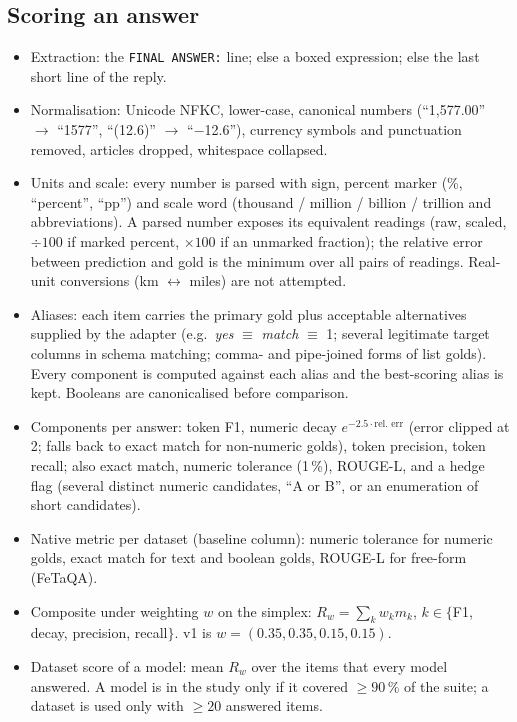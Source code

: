 \documentclass[11pt]{article}
\begin{document}
\subsection{Scoring an answer}
\begin{itemize}
\item Extraction: the \texttt{FINAL ANSWER:} line; else a boxed expression; else the last short line of the reply.
\item Normalisation: Unicode NFKC, lower-case, canonical numbers (``1,577.00'' $\to$ ``1577'', ``(12.6)'' $\to$ ``$-$12.6''), currency symbols and punctuation removed, articles dropped, whitespace collapsed.
\item Units and scale: every number is parsed with sign, percent marker (\%, ``percent'', ``pp'') and scale word (thousand / million / billion / trillion and abbreviations). A parsed number exposes its equivalent readings (raw, scaled, $\div 100$ if marked percent, $\times 100$ if an unmarked fraction); the relative error between prediction and gold is the minimum over all pairs of readings. Real-unit conversions (km $\leftrightarrow$ miles) are not attempted.
\item Aliases: each item carries the primary gold plus acceptable alternatives supplied by the adapter (e.g.\ \emph{yes} $\equiv$ \emph{match} $\equiv$ 1; several legitimate target columns in schema matching; comma- and pipe-joined forms of list golds). Every component is computed against each alias and the best-scoring alias is kept. Booleans are canonicalised before comparison.
\item Components per answer: token F1, numeric decay $e^{-2.5\cdot\text{rel.\ err}}$ (error clipped at 2; falls back to exact match for non-numeric golds), token precision, token recall; also exact match, numeric tolerance (1\,\%), ROUGE-L, and a hedge flag (several distinct numeric candidates, ``A or B'', or an enumeration of short candidates).
\item Native metric per dataset (baseline column): numeric tolerance for numeric golds, exact match for text and boolean golds, ROUGE-L for free-form (FeTaQA).
\item Composite under weighting $w$ on the simplex: $R_w = \sum_k w_k m_k$, $k \in \{$F1, decay, precision, recall$\}$. v1 is $w = (0.35, 0.35, 0.15, 0.15)$.
\item Dataset score of a model: mean $R_w$ over the items that every model answered. A model is in the study only if it covered $\ge 90\,\%$ of the suite; a dataset is used only with $\ge 20$ answered items.
\end{itemize}
\end{document}
